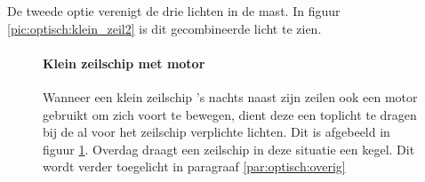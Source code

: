 \vspace{-0.6cm}%
De tweede optie verenigt de drie lichten in de mast. In figuur \ref{pic:optisch:klein_zeil2} is dit gecombineerde licht te zien.



\begin{figure}[H]
	\centering
	\begin{minipage}[t]{0.75\textwidth}
		\paragraph{Klein zeilschip met motor}
		Wanneer een klein zeilschip 's nachts naast zijn zeilen ook een motor gebruikt om zich voort te bewegen, dient deze een toplicht te dragen bij de al voor het zeilschip verplichte lichten. Dit is afgebeeld in figuur \ref{pic:optisch:klein_zeil_motor}. Overdag draagt een zeilschip in deze situatie een kegel. Dit wordt verder toegelicht in paragraaf \ref{par:optisch:overig}
	\end{minipage}
	\hfill
	\begin{minipage}[t]{0.22\textwidth}
		\RemoveLine
		\caption{}
		\label{pic:optisch:klein_zeil_motor}
	\end{minipage}	
\end{figure}

